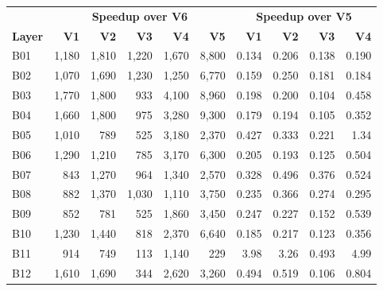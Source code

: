 \begin{tabular}{lrrrrrrrrr}
\hline
\rowcolor{headgrey}
& \multicolumn{5}{c}{\textbf{Speedup over V6}} & \multicolumn{4}{c}{\textbf{Speedup over V5}} \\
\rowcolor{headgrey}
\textbf{Layer} & \textbf{V1} & \textbf{V2} & \textbf{V3} & \textbf{V4} & \textbf{V5} & \textbf{V1} & \textbf{V2} & \textbf{V3} & \textbf{V4} \\ \hline
B01 & 1{,}180 & 1{,}810 & 1{,}220 & 1{,}670 & 8{,}800 & 0.134 & 0.206 & 0.138 & 0.190 \\
B02 & 1{,}070 & 1{,}690 & 1{,}230 & 1{,}250 & 6{,}770 & 0.159 & 0.250 & 0.181 & 0.184 \\
B03 & 1{,}770 & 1{,}800 & 933 & 4{,}100 & 8{,}960 & 0.198 & 0.200 & 0.104 & 0.458 \\
B04 & 1{,}660 & 1{,}800 & 975 & 3{,}280 & 9{,}300 & 0.179 & 0.194 & 0.105 & 0.352 \\
B05 & 1{,}010 & 789 & 525 & 3{,}180 & 2{,}370 & 0.427 & 0.333 & 0.221 & 1.34 \\
B06 & 1{,}290 & 1{,}210 & 785 & 3{,}170 & 6{,}300 & 0.205 & 0.193 & 0.125 & 0.504 \\
B07 & 843 & 1{,}270 & 964 & 1{,}340 & 2{,}570 & 0.328 & 0.496 & 0.376 & 0.524 \\
B08 & 882 & 1{,}370 & 1{,}030 & 1{,}110 & 3{,}750 & 0.235 & 0.366 & 0.274 & 0.295 \\
B09 & 852 & 781 & 525 & 1{,}860 & 3{,}450 & 0.247 & 0.227 & 0.152 & 0.539 \\
B10 & 1{,}230 & 1{,}440 & 818 & 2{,}370 & 6{,}640 & 0.185 & 0.217 & 0.123 & 0.356 \\
B11 & 914 & 749 & 113 & 1{,}140 & 229 & 3.98 & 3.26 & 0.493 & 4.99 \\
B12 & 1{,}610 & 1{,}690 & 344 & 2{,}620 & 3{,}260 & 0.494 & 0.519 & 0.106 & 0.804 \\
\hline
\end{tabular}
